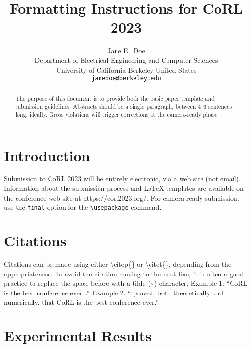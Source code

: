 \documentclass{article}
\title{Formatting Instructions for CoRL 2023}
\author{
  Jane E.~Doe\\
  Department of Electrical Engineering and Computer Sciences\\
  University of California Berkeley 
  United States\\
  \texttt{janedoe@berkeley.edu} \\
}
\begin{document}
\maketitle


\begin{abstract}
    The purpose of this document is to provide both the basic paper template and submission guidelines. Abstracts should be a single paragraph, between 4--6 sentences long, ideally. Gross violations will trigger corrections at the camera-ready phase.
\end{abstract}



\section{Introduction}
	
    Submission to CoRL 2023 will be entirely electronic, via a web site (not email). Information about the submission process and \LaTeX{} templates are available on the conference web site at \url{https://corl2023.org/}. For camera ready submission, use the \texttt{final} option for the \texttt{\textbackslash usepackage} command. 


\section{Citations}
\label{sec:citations}

	Citations can be made using either \textbackslash citep\{\} or \textbackslash citet\{\}, depending from the appropriateness. To avoid the citation moving to the next line, it is often a good practice to replace the space before with a tilde (\~{}) character.
	Example 1: ``CoRL is the best conference ever~\citep{Gauss1857}.''
	Example 2: ``\citet{Lagrange1788} proved, both theoretically and numerically, that CoRL is the best conference ever.''
	

\section{Experimental Results}
\label{sec:result}
\end{document}
